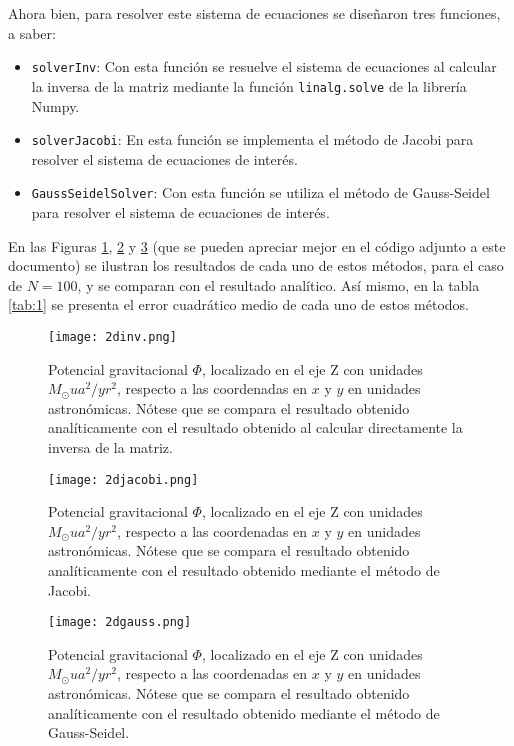 \documentclass[reprint,amsmath,amssymb,aps]{revtex4-1}
\begin{document}
Ahora bien, para resolver este sistema de ecuaciones se diseñaron tres funciones, a saber:
\begin{itemize}
    \item \texttt{solverInv}: Con esta función se resuelve el sistema de ecuaciones al calcular la inversa de la matriz mediante la función \texttt{linalg.solve} de la librería Numpy.
    \item \texttt{solverJacobi}: En esta función se implementa el método de Jacobi para resolver el sistema de ecuaciones de interés.
    \item \texttt{GaussSeidelSolver}: Con esta función se utiliza el método de Gauss-Seidel para resolver el sistema de ecuaciones de interés.
\end{itemize}
En las Figuras \ref{fig:1}, \ref{fig:2} y \ref{fig:3} (que se pueden apreciar mejor en el código adjunto a este documento) se ilustran los resultados de cada uno de estos métodos, para el caso de $N=100$, y se comparan con el resultado analítico. Así mismo, en la tabla \ref{tab:1} se presenta el error cuadrático medio de cada uno de estos métodos.\\
\begin{figure}
    \centering
    \texttt{[image: 2dinv.png]}
    \caption{Potencial gravitacional $\varPhi$, localizado en el eje Z con unidades $M_{\odot} ua^2/yr^2$, respecto a las coordenadas en $x$ y $y$ en unidades astronómicas. Nótese que se compara el resultado obtenido analíticamente con el resultado obtenido al calcular directamente la inversa de la matriz.}
    \label{fig:1}
\end{figure}
\begin{figure}
    \centering
    \texttt{[image: 2djacobi.png]}
    \caption{Potencial gravitacional $\varPhi$, localizado en el eje Z con unidades $M_{\odot} ua^2/yr^2$, respecto a las coordenadas en $x$ y $y$ en unidades astronómicas. Nótese que se compara el resultado obtenido analíticamente con el resultado obtenido mediante el método de Jacobi.}
    \label{fig:2}
\end{figure}
\begin{figure}
    \centering
    \texttt{[image: 2dgauss.png]}
    \caption{Potencial gravitacional $\varPhi$, localizado en el eje Z con unidades $M_{\odot} ua^2/yr^2$, respecto a las coordenadas en $x$ y $y$ en unidades astronómicas. Nótese que se compara el resultado obtenido analíticamente con el resultado obtenido mediante el método de Gauss-Seidel.}
    \label{fig:3}
\end{figure}
\end{document}
